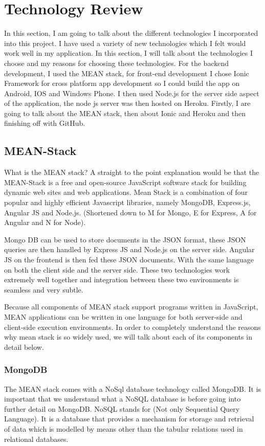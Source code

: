 \chapter{Technology Review}
In this section, I am going to talk about the different technologies I incorporated into this project.
I have used a variety of new technologies which I felt would work well in my application. In this section, I will talk about the technologies I choose and my reasons for choosing these technologies. 
For the backend development, I used the MEAN stack, for front-end development I chose Ionic Framework for cross platform app development so I could build the app on Android, IOS and Windows Phone. I then used Node.js for the server side aspect of the application, the node js server was then hosted on Heroku. Firstly, I are going to talk about the MEAN stack, then about Ionic and Heroku and then finishing off with GitHub. 

\section{MEAN-Stack}
What is the MEAN stack? A straight to the point explanation would be that the MEAN-Stack is a free and open-source JavaScript software stack for building dynamic web sites and web applications. Mean Stack is a combination of four popular and highly efficient Javascript libraries, namely MongoDB, Express.js, Angular JS and Node.js. (Shortened down to M for Mongo, E for Express, A for Angular and N for Node). 

Mongo DB can be used to store documents in the JSON format, these JSON queries are then handled by Express JS and Node.js on the server side. Angular JS on the frontend is then fed these JSON documents. With the same language on both the client side and the server side. These two technologies work extremely well together and integration between these two environments is seamless and very subtle.\cite{Mean-Stack}

Because all components of MEAN stack support programs written in JavaScript, MEAN applications can be written in one language for both server-side and client-side execution environments. In order to completely understand the reasons why mean stack is so widely used, we will talk about each of its components in detail below. 



\subsection{MongoDB}
The MEAN stack comes with a NoSql database technology called MongoDB.
It is important that we understand what a NoSQL database is before going into further detail on MongoDB. NoSQL stands for (Not only Sequential Query Language). It is a database that provides a mechanism for storage and retrieval of data which is modelled by means other than the tabular relations used in relational databases. 


